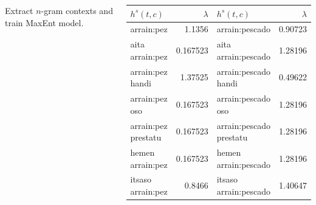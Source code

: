 \documentclass[25pt, a0paper, portrait, margin=0mm, innermargin=15mm,blockverticalspace=15mm, colspace=15mm, subcolspace=8mm]{tikzposter}
\begin{document}
\begin{columns}
{Extract $n$-gram contexts and train MaxEnt model.

\begin{center}
\begin{tabular}{|l|r|l|r|}
\hline
$h^s(t,c)$ & $\lambda$ & $h^s(t,c)$ & $\lambda$ \\
\hline
arrain:pez & 1.1356 & arrain:pescado & 0.90723 \\
aita arrain:pez & 0.167523 & aita arrain:pescado & 1.28196 \\
arrain:pez handi & 1.37525 & arrain:pescado handi & 0.49622 \\ 
arrain:pez oso & 0.167523 & arrain:pescado oso & 1.28196  \\ 
arrain:pez prestatu & 0.167523 & arrain:pescado prestatu & 1.28196  \\
hemen arrain:pez & 0.167523 & hemen arrain:pescado & 1.28196 \\ 
itsaso arrain:pez & 0.8466  & itsaso arrain:pescado & 1.40647  \\

\hline
\end{tabular}
\end{center}

}



\end{columns}
\end{document}
